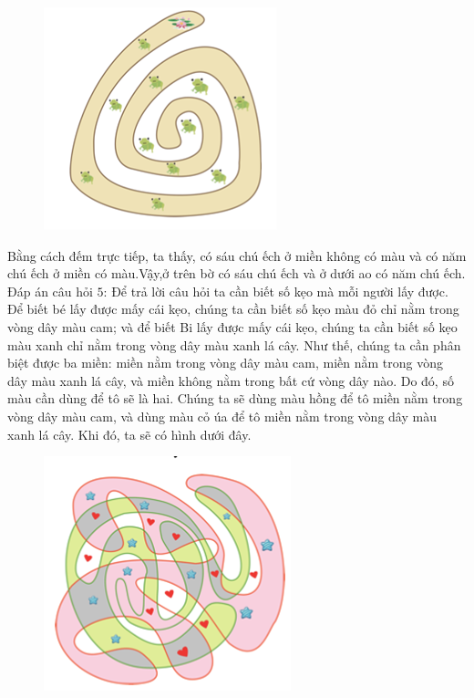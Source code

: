\begin{figure}[H]
	\centering
	\vspace*{-5pt}
	\captionsetup{labelformat= empty, justification=centering}
	\includegraphics[width=0.4\linewidth]{1}
	\vspace*{-15pt}
\end{figure}
Bằng cách đếm trực tiếp, ta thấy, có sáu chú ếch ở miền không có màu và có năm chú ếch ở miền có màu.Vậy,ở trên bờ có sáu chú ếch và ở dưới ao có năm chú ếch. 
\vskip 0.1cm
Đáp án câu hỏi $5$:
\vskip 0.1cm
Để trả lời câu hỏi ta cần biết số kẹo mà mỗi người lấy được. Để biết bé lấy được mấy cái kẹo, chúng ta cần biết số kẹo màu đỏ chỉ nằm trong vòng dây màu cam; và để biết Bi lấy được mấy cái kẹo, chúng ta cần biết số kẹo màu xanh chỉ nằm trong vòng dây màu xanh lá cây. 
\vskip 0.1cm
Như thế, chúng ta cần phân biệt được ba miền: miền nằm trong vòng dây màu cam, miền nằm trong vòng dây màu xanh lá cây, và miền không nằm trong bất cứ vòng dây nào. Do đó, số màu cần dùng để tô sẽ là hai. Chúng ta sẽ dùng màu hồng để tô miền nằm trong vòng dây màu cam, và dùng màu cỏ úa để tô miền nằm trong vòng dây màu xanh lá cây. Khi đó, ta sẽ có hình dưới đây. 
\begin{figure}[H]
	\centering
	\vspace*{-5pt}
	\captionsetup{labelformat= empty, justification=centering}
	\includegraphics[width=0.4\linewidth]{2}
	\vspace*{-15pt}
\end{figure}
